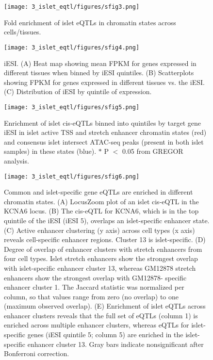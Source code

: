 \begin{figure}
    \centering
    \texttt{[image: 3\_islet\_eqtl/figures/sfig3.png]}
    \caption{Fold enrichment of islet eQTLs in chromatin states across cells/tissues.}
    \label{fig:c2_sf3}
\end{figure}

\begin{figure}
    \centering
    \texttt{[image: 3\_islet\_eqtl/figures/sfig4.png]}
    \caption[iESI]{iESI. (A) Heat map showing mean FPKM for genes expressed in different tissues when binned by iESI quintiles. (B) Scatterplots showing FPKM for genes expressed in different tissues vs. the iESI. (C) Distribution of iESI by quintile of expression.}
    \label{fig:c2_sf4}
\end{figure}

\begin{figure}
    \centering
    \texttt{[image: 3\_islet\_eqtl/figures/sfig5.png]}
    \caption[Enrichment of islet cis-eQTLs based on the expression specificity of the target gene]{Enrichment of islet cis-eQTLs binned into quintiles by target gene iESI in islet active TSS and stretch enhancer chromatin states (red) and consensus islet intersect ATAC-seq peaks (present in both islet samples) in these states (blue). $\ast$ P $<$ 0.05 from GREGOR analysis.}
    \label{fig:c2_sf5}
\end{figure}

\begin{figure}
    \centering
    \texttt{[image: 3\_islet\_eqtl/figures/sfig6.png]}
    \caption[Common and islet-specific gene eQTLs are enriched in different chromatin states]{Common and islet-specific gene eQTLs are enriched in different chromatin states. (A) LocusZoom plot of an islet cis-eQTL in the KCNA6 locus. (B) The cis-eQTL for KCNA6, which is in the top quintile of the iESI (iESI 5), overlaps an islet-specific enhancer state. (C) Active enhancer clustering (y axis) across cell types (x axis) reveals cell-specific enhancer regions. Cluster 13 is islet-specific. (D) Degree of overlap of enhancer clusters with stretch enhancers from four cell types. Islet stretch enhancers show the strongest overlap with islet-specific enhancer cluster 13, whereas GM12878 stretch enhancers show the strongest overlap with GM12878- specific enhancer cluster 1. The Jaccard statistic was normalized per column, so that values range from zero (no overlap) to one (maximum observed overlap). (E) Enrichment of islet eQTLs across enhancer clusters reveals that the full set of eQTLs (column 1) is enriched across multiple enhancer clusters, whereas eQTLs for islet-specific genes (iESI quintile 5; column 5) are enriched in the islet-specific enhancer cluster 13. Gray bars indicate nonsignificant after Bonferroni correction.}
    \label{fig:c2_sf6}
\end{figure}


